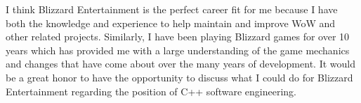 \documentclass[11pt,a4paper,sans]{moderncv} %
\begin{document}
\hspace{1cm} I think Blizzard Entertainment is the perfect career fit for me because I have both the knowledge and experience to help maintain and improve WoW and other related projects. Similarly, I have been playing Blizzard games for over 10 years which has provided me with a large understanding of the game mechanics and changes that have come about over the many years of development. It would be a great honor to have the opportunity to discuss what I could do for Blizzard Entertainment regarding the position of C++ software engineering.

\makeletterclosing %

\end{document}
